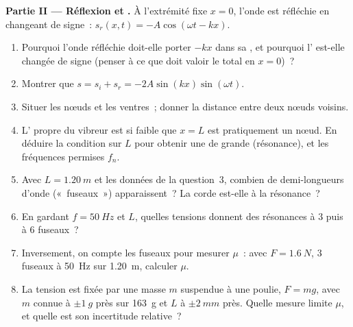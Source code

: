 \begin{problem}
\medskip
\noindent\textbf{Partie II --- Réflexion et .}
À l'extrémité fixe $x = 0$, l'onde est réfléchie en changeant de signe~:
$s_r(x, t) = -A\cos(\omega t - kx)$.
\begin{enumerate}[resume]
  \item Pourquoi l'onde réfléchie doit-elle porter $-kx$ dans sa ,
        et pourquoi l' est-elle changée de signe (penser à ce
        que doit valoir le  total en $x = 0$)~?
  \item Montrer que $s = s_i + s_r = -2A\sin(kx)\sin(\omega t)$.
  \item Situer les nœuds et les ventres~; donner la distance entre deux
        nœuds voisins.
  \item L' propre du vibreur est si faible que $x = L$ est
        pratiquement un nœud. En déduire la condition sur $L$ pour
        obtenir une  de grande  (résonance),
        et les fréquences permises $f_n$.
  \item Avec $L = \qty{1.20}{m}$ et les données de la question~3, combien
        de demi-longueurs d'onde («~fuseaux~») apparaissent~? La corde
        est-elle à la résonance~?
  \item En gardant $f = \qty{50}{Hz}$ et $L$, quelles tensions donnent
        des résonances à $3$ puis à $6$ fuseaux~?
  \item Inversement, on compte les fuseaux pour mesurer $\mu$~: avec
        $F = \qty{1.6}{N}$, $3$ fuseaux à \qty{50}{Hz} sur \qty{1.20}{m},
        calculer $\mu$.
  \item La tension est fixée par une masse $m$ suspendue à une poulie,
        $F = mg$, avec $m$ connue à $\pm\qty{1}{g}$ près sur \qty{163}{g}
        et $L$ à $\pm\qty{2}{mm}$ près. Quelle mesure limite $\mu$, et
        quelle est son incertitude relative~?
\end{enumerate}


\end{problem}
